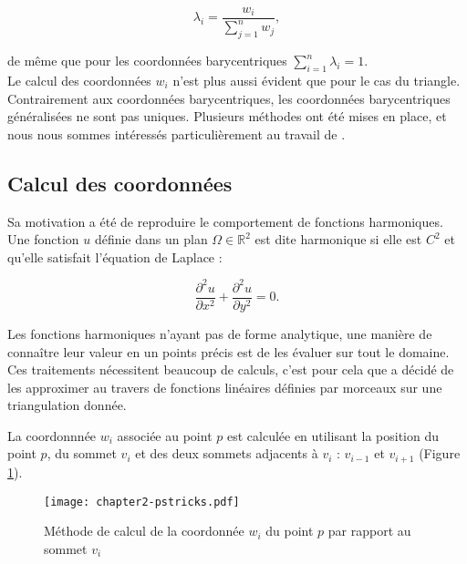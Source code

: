 \begin{equation}
  \lambda_i = \frac{w_i}{\sum_{j=1}^n w_j},
\end{equation}

de même que pour les coordonnées barycentriques $\sum_{i=1}^n \lambda_i = 1$.
\\

Le calcul des coordonnées $w_i$ n'est plus aussi évident que pour le cas du
triangle. Contrairement aux coordonnées barycentriques, les coordonnées
barycentriques généralisées ne sont pas uniques. Plusieurs méthodes ont été
mises en place, et nous nous sommes intéressés particulièrement au travail de
\cite{Flo03}.

\subsection{Calcul des coordonnées}

Sa motivation a été de reproduire le comportement de fonctions harmoniques.
Une fonction $u$ définie dans un plan $\Omega \in \mathbb{R}^2$ est dite
harmonique si elle est $C^2$ et qu'elle satisfait l'équation de Laplace :

\begin{equation}
  \frac{\partial^2 u}{\partial x^2} + \frac{\partial^2 u}{\partial y^2} = 0.
\end{equation}

Les fonctions harmoniques n'ayant pas de forme analytique, une manière de
connaître leur valeur en un points précis est de les évaluer sur tout le
domaine. Ces traitements nécessitent beaucoup de calculs, c'est pour cela que
\cite{Flo03} a décidé de les approximer au travers de fonctions linéaires
définies par morceaux sur une triangulation donnée.

La coordonnnée $w_i$ associée au point $p$ est calculée en utilisant la
position du point $p$, du sommet $v_i$ et des deux sommets adjacents à $v_i$ :
$v_{i-1}$ et $v_{i+1}$ (Figure \ref{DEFcal}).

\begin{figure}[ht]
  \begin{center}
    \texttt{[image: chapter2-pstricks.pdf]}

    \caption[Méthode de calcul MVC] {Méthode de calcul de la coordonnée $w_i$
du point $p$ par rapport au sommet $v_i$}

    \label{DEFcal}   \end{center} \end{figure}

